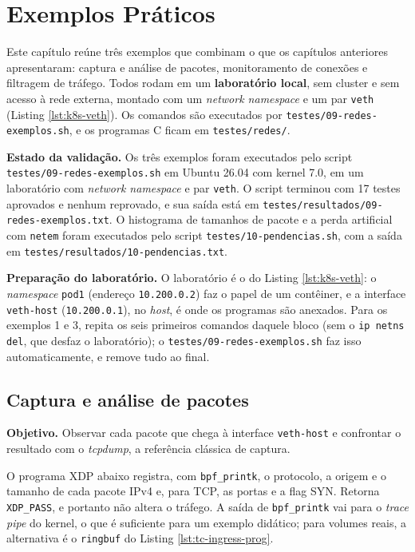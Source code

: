 \chapter{Exemplos Práticos}
\label{cap:exemplos-redes}

Este capítulo reúne três exemplos que combinam o que os capítulos anteriores
apresentaram: captura e análise de pacotes, monitoramento de conexões e filtragem de
tráfego. Todos rodam em um \textbf{laboratório local}, sem cluster e sem acesso à
rede externa, montado com um \textit{network namespace} e um par \texttt{veth}
(Listing \ref{lst:k8s-veth}). Os comandos são executados por
\texttt{testes/09-redes-exemplos.sh}, e os programas C ficam em \texttt{testes/redes/}.

\textbf{Estado da validação.} Os três exemplos foram executados pelo script
\texttt{testes/09-redes-exemplos.sh} em Ubuntu 26.04 com kernel 7.0, em um laboratório
com \textit{network namespace} e par \texttt{veth}. O script terminou com 17 testes
aprovados e nenhum reprovado, e sua saída está em
\texttt{testes/resultados/09-redes-exemplos.txt}. O histograma de tamanhos de pacote e a perda artificial com
\texttt{netem} foram executados pelo script \texttt{testes/10-pendencias.sh}, com a
saída em \texttt{testes/resultados/10-pendencias.txt}.

\textbf{Preparação do laboratório.} O laboratório é o do Listing \ref{lst:k8s-veth}: o
\textit{namespace} \texttt{pod1} (endereço \texttt{10.200.0.2}) faz o papel de um
contêiner, e a interface \texttt{veth-host} (\texttt{10.200.0.1}), no \textit{host}, é
onde os programas são anexados. Para os exemplos 1 e 3, repita os seis primeiros
comandos daquele bloco (sem o \texttt{ip netns del}, que desfaz o laboratório); o
\texttt{testes/09-redes-exemplos.sh} faz isso automaticamente, e remove tudo ao final.

\section{Captura e análise de pacotes}

\textbf{Objetivo.} Observar cada pacote que chega à interface \texttt{veth-host} e
confrontar o resultado com o \textit{tcpdump}, a referência clássica de captura.

O programa XDP abaixo registra, com \texttt{bpf\_printk}, o protocolo, a origem e o
tamanho de cada pacote IPv4 e, para TCP, as portas e a flag SYN. Retorna
\texttt{XDP\_PASS}, e portanto não altera o tráfego. A saída de \texttt{bpf\_printk} vai
para o \textit{trace pipe} do kernel, o que é suficiente para um exemplo didático;
para volumes reais, a alternativa é o \texttt{ringbuf} do Listing \ref{lst:tc-ingress-prog}.

